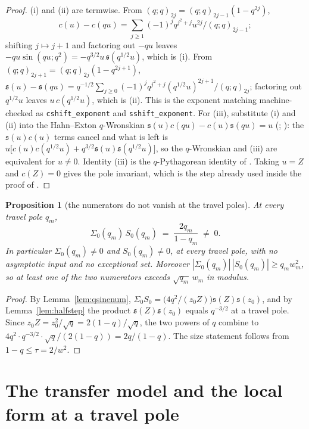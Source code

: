 \documentclass[11pt]{article}
\theoremstyle{plain}
\newtheorem{proposition}[theorem]{Proposition}
\theoremstyle{definition}
\theoremstyle{remark}
\theoremstyle{plain}\newtheorem*{maintheorem}{Main Theorem}
\begin{document}
\begin{proof}
(i) and (ii) are termwise. From $(q;q)_{2j}=(q;q)_{2j-1}(1-q^{2j})$,
\[
   c(u)-c(qu)=\sum_{j\ge1}(-1)^jq^{j^2+j}u^{2j}/(q;q)_{2j-1};
\]
shifting $j\mapsto j+1$ and factoring
out $-qu$ leaves $-qu\sin(qu;q^2)=-q^{3/2}u\,\mathfrak s(q^{1/2}u)$, which is (i). From
$(q;q)_{2j+1}=(q;q)_{2j}(1-q^{2j+1})$,
$\mathfrak s(u)-\mathfrak s(qu)=q^{-1/2}\sum_{j\ge0}(-1)^jq^{j^2+j}(q^{1/2}u)^{2j+1}/(q;q)_{2j}$;
factoring out $q^{1/2}u$ leaves $u\,c(q^{1/2}u)$, which is (ii). This is the exponent
matching machine-checked as \texttt{cshift\_exponent} and \texttt{sshift\_exponent}. For (iii),
substitute (i) and (ii) into the Hahn--Exton $q$-Wronskian
$\mathfrak s(u)c(qu)-c(u)\mathfrak s(qu)=u$ (\cite[eq.~(4.3.8)]{Swarttouw1992};
\cite[eq.~(4.21)]{Daalhuis1994}): the $\mathfrak s(u)c(u)$ terms cancel and what is left is
$u\bigl[c(u)c(q^{1/2}u)+q^{3/2}\mathfrak s(u)\mathfrak s(q^{1/2}u)\bigr]$, so the $q$-Wronskian and
(iii) are equivalent for $u\ne0$. Identity (iii) is the $q$-Pythagorean identity of
\cite{KS1992}. Taking $u=Z$ and $c(Z)=0$ gives the pole invariant, which is the step already used
inside the proof of {\cite[Proposition \textup{prop:P12second}]{Bonfioli2026bB}}.
\end{proof}

\begin{proposition}[the numerators do not vanish at the travel poles]\label{prop:numnonvanish}
At every travel pole $q_m$,
\begin{equation}\label{eq:numprod}
   \Sigma_0(q_m)\,S_0(q_m)\;=\;\frac{2q_m}{1-q_m}\;\ne\;0 .
\end{equation}
In particular $\Sigma_0(q_m)\ne0$ and $S_0(q_m)\ne0$, at \emph{every} travel pole, with no
asymptotic input and no exceptional set. Moreover $|\Sigma_0(q_m)|\,|S_0(q_m)|\ge q_mw_m^2$, so at
least one of the two numerators exceeds $\sqrt{q_m}\,w_m$ in modulus.
\end{proposition}

\begin{proof}
By Lemma~\ref{lem:qsinenum}, $\Sigma_0S_0=\bigl(4q^2/(z_0Z)\bigr)\mathfrak s(Z)\mathfrak s(z_0)$,
and by Lemma~\ref{lem:halfstep} the product $\mathfrak s(Z)\mathfrak s(z_0)$ equals $q^{-3/2}$ at a
travel pole. Since $z_0Z=z_0^2/\sqrt q=2(1-q)/\sqrt q$, the two powers of $q$ combine to
$4q^2\cdot q^{-3/2}\cdot\sqrt q/(2(1-q))=2q/(1-q)$. The size statement follows from
$1-q\le\tau=2/w^2$.
\end{proof}

\section{The transfer model and the local form at a travel pole}\label{sec:modelassembly}
\end{document}
